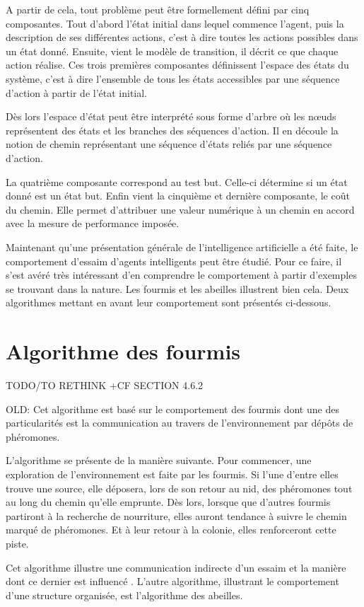 A partir de cela, tout problème peut être formellement défini par cinq composantes. Tout d'abord l'état initial dans lequel commence l'agent, puis la description de ses différentes actions, c'est à dire toutes les actions possibles dans un état donné. Ensuite, vient le modèle de transition, il décrit ce que chaque action réalise. Ces trois premières composantes définissent l'espace des états du système, c'est à dire l'ensemble de tous les états accessibles par une séquence d'action à partir de l'état initial.

Dès lors l'espace d'état peut être interprété sous forme d'arbre où les nœuds représentent des états et les branches des séquences d'action. Il en découle la notion de chemin représentant une séquence d'états reliés par une séquence d'action.

La quatrième composante correspond au test but. Celle-ci détermine si un état donné est un état but. Enfin vient la cinquième et dernière composante, le coût du chemin. Elle permet d'attribuer une valeur numérique à un chemin en accord avec la mesure de performance imposée.

Maintenant qu'une présentation générale de l'intelligence artificielle a été faite, le comportement d'essaim d'agents intelligents peut être étudié. Pour ce faire, il s'est avéré très intéressant d'en comprendre le comportement à partir d'exemples se trouvant dans la nature. Les fourmis et les abeilles illustrent bien cela. Deux algorithmes mettant en avant leur comportement sont présentés ci-dessous.

\section{Algorithme des fourmis}

TODO/TO RETHINK +CF SECTION 4.6.2

OLD:
Cet algorithme est basé sur le comportement des fourmis dont une des particularités est la communication au travers de l'environnement par dépôts de phéromones.

L'algorithme se présente de la manière suivante. Pour commencer, une exploration de l'environnement est faite par les fourmis. Si l'une d'entre elles trouve une source, elle déposera, lors de son retour au nid, des phéromones tout au long du chemin qu'elle emprunte. Dès lors, lorsque que d'autres fourmis partiront à la recherche de nourriture, elles auront tendance à suivre le chemin  marqué de phéromones. Et à leur retour à la colonie, elles renforceront cette piste.

Cet algorithme illustre une communication indirecte d'un essaim et la manière dont ce dernier est influencé \cite{antOpti}. L'autre algorithme, illustrant le comportement d'une structure organisée, est l'algorithme des abeilles.
